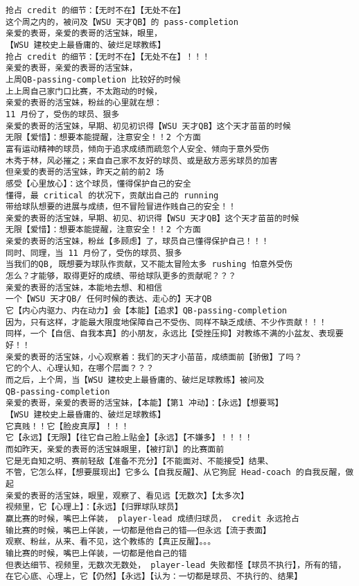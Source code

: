 \documentclass[9pt, b5paper]{article}
\begin{document}
\begin{verbatim}
抢占 credit 的细节：【无时不在】【无处不在】
这个周之内的，被问及【WSU 天才QB】的 pass-completion
亲爱的表哥，亲爱的表哥的活宝妹，眼里，
【WSU 建校史上最昏庸的、破烂足球教练】
抢占 credit 的细节：【无时不在】【无处不在】！！！
亲爱的表哥，亲爱的表哥的活宝妹，
上周QB-passing-completion 比较好的时候
上上周自己家门口比赛，不太跑动的时候，
亲爱的表哥的活宝妹，粉丝的心里就在想：
11 月份了，受伤的球员、狠多
亲爱的表哥的活宝妹，早期、初见初识得【WSU 天才QB】这个天才苗苗的时候
无限【爱惜】：想要本能提醒，注意安全！！2 个方面 
富有运动精神的球员，倾向于追求成绩而疏忽个人安全、倾向于意外受伤
木秀于林，风必摧之；来自自己家不友好的球员、或是敌方恶劣球员的加害
但亲爱的表哥的活宝妹，昨天之前的前2 场
感受【心里放心】：这个球员，懂得保护自己的安全
懂得，最 critical 的状况下，贡献出自己的 running 
带给球队想要的进展与成绩，但不冒险冒进作贱自己的安全！！
亲爱的表哥的活宝妹，早期、初见、初识得【WSU 天才QB】这个天才苗苗的时候
无限【爱惜】：想要本能提醒，注意安全！！2 个方面
亲爱的表哥的活宝妹，粉丝【多顾虑】了，球员自己懂得保护自己！！！
同时、同理，当 11 月份了，受伤的球员、狠多
当我们的QB, 既想要为球队作贡献，又不能太冒险太多 rushing 怕意外受伤
怎么？才能够，取得更好的成绩、带给球队更多的贡献呢？？？
亲爱的表哥的活宝妹，本能地去想、和相信
一个【WSU 天才QB/ 任何时候的表达、走心的】天才QB 
它【内心内驱力、内在动力】会【本能】【追求】QB-passing-completion
因为，只有这样，才能最大限度地保障自己不受伤、同样不缺乏成绩、不少作贡献！！！
同样，一个【自信、自我本真】的小朋友，永远比【受挫压抑】对教练不满的小盆友、表现要好！！
亲爱的表哥的活宝妹，小心观察着：我们的天才小苗苗，成绩面前【骄傲】了吗？
它的个人、心理认知，在哪个层面？？？
而之后，上个周，当【WSU 建校史上最昏庸的、破烂足球教练】被问及
QB-passing-completion
亲爱的表哥，亲爱的表哥的活宝妹，【本能】【第1 冲动】：【永远】【想要骂】
【WSU 建校史上最昏庸的、破烂足球教练】
它真贱！！它【脸皮真厚】！！！
它【永远】【无限】【往它自己脸上贴金】【永远】【不嫌多】！！！！
而如昨天，亲爱的表哥的活宝妹眼里，【被打趴】的比赛面前
它是无自知之明、赛前轻敌【准备不充分】【不能面对、不能接受】结果、
不管，它怎么样，【想要展现出】它多么【自我反醒】、从它狗屁 Head-coach 的自我反醒，做起
亲爱的表哥的活宝妹，眼里，观察了、看见远【无数次】【太多次】
视频里，它【心理上】：【永远】【归罪球队球员】
赢比赛的时候，嘴巴上佯装， player-lead 成绩归球员， credit 永远抢占
输比赛的时候，嘴巴上佯装，一切都是他自己的错——但永远【流于表面】
观察、粉丝，从来、看不见，这个教练的【真正反醒】。。。
输比赛的时候，嘴巴上佯装，一切都是他自己的错
但表达细节、视频里，无数次无数处， player-lead 失败都怪【球员不执行】，所有的错，
在它心底、心理上，它【仍然】【永远】【认为：一切都是球员、不执行的、结果】

\end{verbatim}
\end{document}
